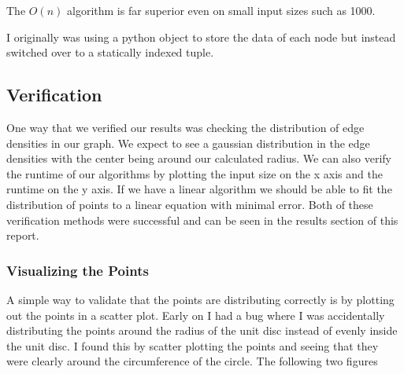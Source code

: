 \documentclass{article}
\begin{document}
	  The $O(n)$ algorithm is far superior even on small input sizes such as 1000.

    I originally was using a python object to store the data of each node but instead switched over to a statically indexed tuple.

	\subsection{Verification}
		One way that we verified our results was checking the distribution of edge densities in our graph.
		We expect to see a gaussian distribution in the edge densities with the center being around our calculated radius.
		We can also verify the runtime of our algorithms by plotting the input size on the x axis and the runtime on the y axis.
		If we have a linear algorithm we should be able to fit the distribution of points to a linear equation with minimal error.
		Both of these verification methods were successful and can be seen in the results section of this report.

  \subsubsection{Visualizing the Points}
    A simple way to validate that the points are distributing correctly is by plotting out the points in a scatter plot.
    Early on I had a bug where I was accidentally distributing the points around the radius of the unit disc instead of evenly inside the unit disc.
    I found this by scatter plotting the points and seeing that they were clearly around the circumference of the circle.
    The following two figures
\end{document}

